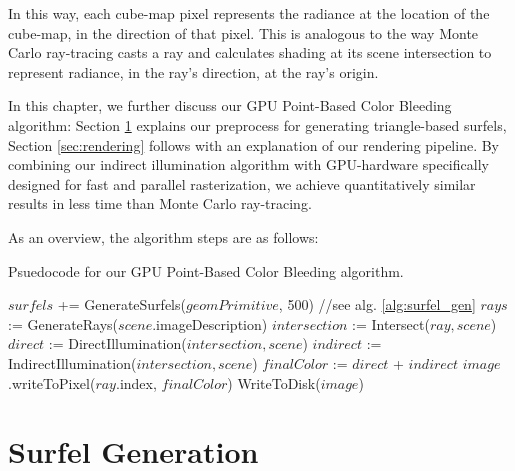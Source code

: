 In this way, each cube-map pixel represents the radiance at the location of the cube-map, in the direction of that pixel. This is analogous to the way Monte Carlo ray-tracing casts a ray and calculates shading at its scene intersection to represent radiance, in the ray's direction, at the ray's origin.

In this chapter, we further discuss our GPU Point-Based Color Bleeding algorithm: Section \ref{sec:surfel_generation} explains our preprocess for generating triangle-based surfels, Section \ref{sec:rendering} follows with an explanation of our rendering pipeline. By combining our indirect illumination algorithm with GPU-hardware specifically designed for fast and parallel rasterization, we achieve quantitatively similar results in less time than Monte Carlo ray-tracing.

As an overview, the algorithm steps are as follows:

\begin{algorithm}[H]
\captionfont
\caption[GPU PBCB Algorithm]{Psuedocode for our GPU Point-Based Color Bleeding algorithm.}
\label{alg:gpu_pbcb}
{\fontsize{10}{9}\selectfont
\begin{algorithmic}
         \State $surfels$ += GenerateSurfels($geomPrimitive$, 500) //see alg. \ref{alg:surfel_gen}
      \EndFor
      \State $rays$ := GenerateRays($scene$.imageDescription)
         \State $intersection$ := Intersect($ray, scene$)
         \State $direct$ := DirectIllumination($intersection, scene$)
         \State $indirect$ := IndirectIllumination($intersection, scene$)
         \State $finalColor$ := $direct$ + $indirect$
         \State $image$.writeToPixel($ray$.index, $finalColor$)
      \EndFor
      \State WriteToDisk($image$)
   \EndFunction
\end{algorithmic}
}
\end{algorithm}

\section{Surfel Generation}
\label{sec:surfel_generation}

